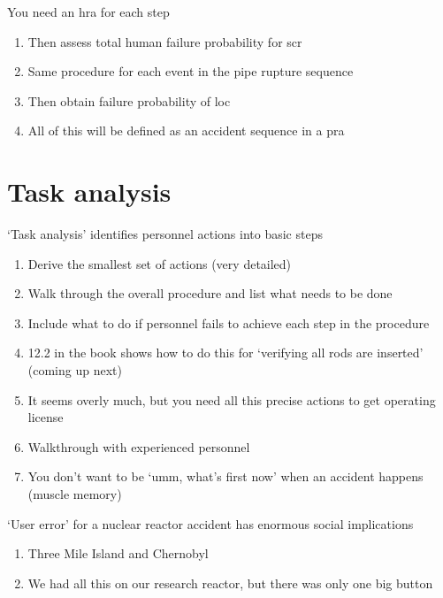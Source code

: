 \documentclass[aspectratio=1610,pdftex,dvipsnames,compress,xcolor={dvipsnames}]{beamer}
\newcommand{\acs}{\acrshort} %
\begin{document}
\begin{frame}{You need an \acs{hra} for each step}
    \begin{enumerate}[series=outerlist,topsep=0pt,itemsep=21pt,leftmargin=*,label=(\arabic*)]
        \item[]Then assess total human failure probability for \acs{scr}
        \item[]Same procedure for each event in the pipe rupture sequence
        \item[]Then obtain failure probability of \acs{loc}
        \item[]All of this will be defined as an accident sequence in a \acs{pra}
    \end{enumerate}
\end{frame}


\section{Task analysis}


\addtocounter{framenumber}{-1}
\begin{frame}{`Task analysis' identifies personnel actions into basic steps}
    \begin{enumerate}[series=outerlist,topsep=0pt,itemsep=15pt,leftmargin=*,label=(\arabic*)]
        \item[]Derive the smallest set of actions (very detailed)
        \item[]Walk through the overall procedure and list what needs to be done  
        \item[]Include what to do if personnel fails to achieve each step in the procedure  
        \item[]12.2 in the book shows how to do this for `verifying all rods are inserted' (coming up next)
        \item[]It seems overly much, but you need all this precise actions to get operating license
        \item[]Walkthrough with experienced personnel 
        \item[]You don't want to be `umm, what's first now' when an accident happens (muscle memory)
    \end{enumerate}
\end{frame}


\begin{frame}{`User error' for a nuclear reactor accident has enormous social implications}
    \begin{enumerate}[series=outerlist,topsep=0pt,itemsep=21pt,leftmargin=*,label=(\arabic*)]
        \item[]Three Mile Island and Chernobyl
        \item[]We had all this on our research reactor, but there was only one big button
    \end{enumerate}
\end{frame}
\end{document}
